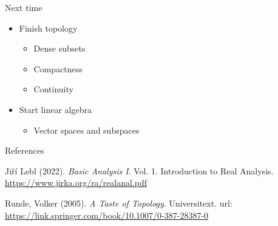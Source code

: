 \documentclass [aspectratio=169]{beamer}
\begin{document}
\begin{frame}{Next time}
    \begin{itemize}
      \setlength\itemsep{1em}
    	\item Finish topology
	\begin{itemize}
	\setlength\itemsep{0.3em}
	\item Dense subsets
	\item Compactness
	\item Continuity
	\end{itemize}
	\item Start linear algebra
	\begin{itemize}
	\setlength\itemsep{0.3em}
	\item Vector spaces and subspaces
	\end{itemize}
    \end{itemize}
\end{frame}


\begin{frame}{References}

Ji\v{r}í Lebl (2022). \textit{Basic Analysis I}. Vol. 1. Introduction to Real Analysis.  \href{ https://www.jirka.org/ra/realanal.pdf}{https://www.jirka.org/ra/realanal.pdf} 

\vspace{1em}


Runde, Volker (2005). \textit{A Taste of Topology}. Universitext.  url:  \href{https://link.springer.com/book/10.1007/0-387-28387-0}{https://link.springer.com/book/10.1007/0-387-28387-0} 


\end{frame}
\end{document}
